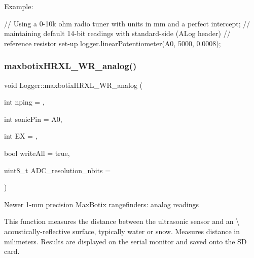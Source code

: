 Example\+: 
\begin{DoxyCode}
\textcolor{comment}{// Using a 0-10k ohm radio tuner with units in mm and a perfect intercept;}
\textcolor{comment}{// maintaining default 14-bit readings with standard-side (ALog header)}
\textcolor{comment}{// reference resistor set-up}
logger.linearPotentiometer(A0, 5000, 0.0008);
\end{DoxyCode}
\mbox{\label{classLogger_a3ce2869bbd48fdebbf44e155981c85b0}} 
\subsubsection{\texorpdfstring{maxbotix\+H\+R\+X\+L\+\_\+\+W\+R\+\_\+analog()}{maxbotixHRXL\_WR\_analog()}}
{\footnotesize\ttfamily void Logger\+::maxbotix\+H\+R\+X\+L\+\_\+\+W\+R\+\_\+analog (\begin{DoxyParamCaption}\item[{int}]{nping = {},  }\item[{int}]{sonic\+Pin = {\ttfamily A0},  }\item[{int}]{EX = {},  }\item[{bool}]{write\+All = {\ttfamily true},  }\item[{uint8\+\_\+t}]{A\+D\+C\+\_\+resolution\+\_\+nbits = {} }\end{DoxyParamCaption})}

Newer 1-\/mm precision Max\+Botix rangefinders\+: analog readings

This function measures the distance between the ultrasonic sensor and an \textbackslash{} acoustically-\/reflective surface, typically water or snow. Measures distance in milimeters. Results are displayed on the serial monitor and saved onto the SD card.


